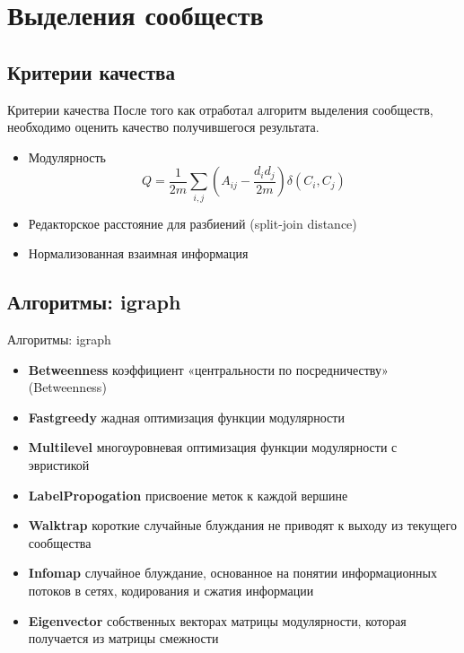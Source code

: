 \documentclass[11pt,pdf,hyperref={unicode}]{beamer}
\begin{document}

\section{Выделения сообществ} %
\label{sec:clustering}

	\subsection{Критерии качества} %
	\label{sub:quality}
		\begin{frame}{Критерии качества} 
			После того как отработал алгоритм выделения сообществ, необходимо оценить качество получившегося результата.
			\begin{itemize}
				\item Модулярность
				$$
				Q = \frac{1}{2m} \displaystyle\sum_{i,j}\left(A_{ij} - \frac{d_i d_j}{2m}\right)\delta(C_i,C_j)
				$$
				\pause \item Редакторское расстояние для разбиений (split-join distance)
				\pause \item Нормализованная взаимная информация
			\end{itemize}
		\end{frame}

	\subsection{Алгоритмы: igraph} %
	\label{sub:algos}
		\begin{frame}{Алгоритмы: igraph}
			\begin{itemize}
				\item \textbf{Betweenness} коэффициент «центральности по посредничеству» (Betweenness)
				\pause \item \textbf{Fastgreedy} жадная оптимизация функции модулярности
				\pause \item \textbf{Multilevel} многоуровневая оптимизация функции модулярности с эвристикой
				\pause \item \textbf{LabelPropogation} присвоение меток к каждой вершине
				\pause \item \textbf{Walktrap} короткие случайные блуждания не приводят к выходу из текущего сообщества
				\pause \item \textbf{Infomap} случайное блуждание, основанное на понятии информационных потоков в сетях, кодирования и сжатия информации
				\pause \item \textbf{Eigenvector} собственных векторах матрицы модулярности, которая получается из матрицы смежности
			\end{itemize}
		\end{frame}
\end{document}
